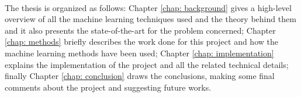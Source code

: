 \paragraph{} The thesis is organized as follows: Chapter \ref{chap: background} gives a high-level overview of all the machine learning techniques used and the theory behind them and it also presents the state-of-the-art for the problem concerned; Chapter \ref{chap: methods} briefly describes the work done for this project and how the machine learning methods have been used; Chapter \ref{chap: implementation} explains the implementation of the project and all the related technical details; finally Chapter \ref{chap: conclusion} draws the conclusions, making some final comments about the project and suggesting future works.

